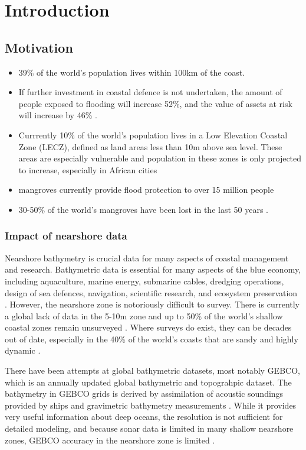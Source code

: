 
\chapter{Introduction}


\section{Motivation}
\begin{itemize}
      \item 39\% of the world's population lives within 100km of the coast.\cite{Magdalena2021}
      \item If further investment in coastal defence is not undertaken, the amount of people exposed to flooding will increase 52\%, and the value of assets at risk will increase by 46\% \cite{Kirezci2020}.
      \item Currrently 10\% of the world's population lives in a Low Elevation Coastal Zone (LECZ), defined as land areas less than 10m above sea level. These areas are especially vulnerable and population in these zones is only projected to increase, especially in African cities \cite{Neumann2015,Lichter2011}
      \item mangroves currently provide flood protection to over 15 million people \cite{Menendez2020}
      \item 30-50\% of the world's mangroves have been lost in the last 50 years \cite{}. 
\end{itemize}
\subsection{Impact of nearshore data}

Nearshore bathymetry is crucial data for many aspects of coastal management and research. Bathymetric data is essential for many aspects of the blue economy, including aquaculture, marine energy, submarine cables, dredging operations, design of sea defences, navigation, scientific research, and ecosystem preservation \cite{Cesbron2021,Ashphaq2021}. However, the nearshore zone is notoriously difficult to survey. There is currently a global lack of data in the 5-10m zone \cite{Albright2021} and up to 50\% of the world's shallow coastal zones remain unsurveyed \cite{IHO/OHI2022}. Where surveys do exist, they can be decades out of date, especially in the 40\% of the world's coasts that are sandy and highly dynamic \cite{Almar2021e}.  

There have been attempts at global bathymetric datasets, most notably GEBCO, which is an annually updated global bathymetric and topograhpic dataset. The bathymetry in GEBCO grids is derived by assimilation of acoustic soundings provided by ships and gravimetric bathymetry measurements \cite{Cesbron2021}. While it provides very useful information about deep oceans, the resolution is not sufficient for detailed modeling, and because sonar data is limited in many shallow nearshore zones, GEBCO accuracy in the nearshore zone is limited \cite{add}.


